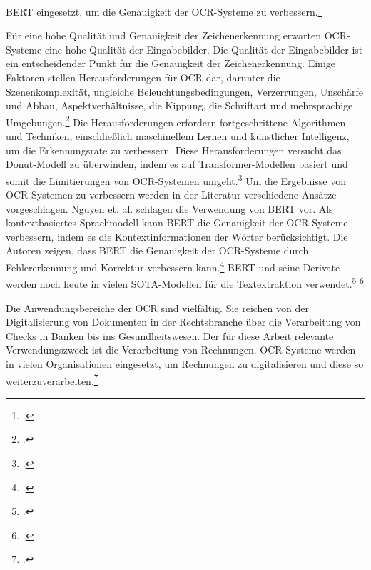 \ac{BERT} eingesetzt, um die Genauigkeit der OCR-Systeme zu verbessern.\footcites[Vgl.][S. 335 f.]{nguyen_neural_2020}

Für eine hohe Qualität und Genauigkeit der Zeichenerkennung erwarten OCR-Systeme eine hohe Qualität der Eingabebilder. Die Qualität der Eingabebilder ist ein entscheidender Punkt für die Genauigkeit der Zeichenerkennung. Einige Faktoren stellen Herausforderungen für OCR dar, darunter die Szenenkomplexität, ungleiche Beleuchtungsbedingungen, Verzerrungen, Unschärfe und Abbau, Aspektverhältnisse, die Kippung, die Schriftart und mehrsprachige Umgebungen.\footcites[Vgl.][S. 245]{hamad_detailed_2016} Die Herausforderungen erfordern fortgeschrittene Algorithmen und Techniken, einschließlich maschinellem Lernen und künstlicher Intelligenz, um die Erkennungsrate zu verbessern. Diese Herausforderungen versucht das Donut-Modell zu überwinden, indem es auf Transformer-Modellen basiert und somit die Limitierungen von OCR-Systemen umgeht.\footcites[Vgl.][S. 1]{kim_ocr-free_2021} Um die Ergebnisse von OCR-Systemen zu verbessern werden in der Literatur verschiedene Ansätze vorgeschlagen. Nguyen et. al. schlagen die Verwendung von BERT vor. Als kontextbasiertes Sprachmodell kann BERT die Genauigkeit der OCR-Systeme verbessern, indem es die Kontextinformationen der Wörter berücksichtigt. Die Autoren zeigen, dass BERT die Genauigkeit der OCR-Systeme durch Fehlererkennung und Korrektur verbessern kann.\footcites[Vgl.][S. 335 f.]{nguyen_neural_2020} BERT und seine Derivate werden noch heute in vielen \ac{SOTA}-Modellen für die Textextraktion verwendet.\footcites[Vgl. dazu ausführlich][S. 4084 ff.]{huang_layoutlmv3_2022} \footcites[Vgl. dazu ausführlich][S. 2 ff.]{garncarek_lambert_2020}

Die Anwendungsbereiche der OCR sind vielfältig. Sie reichen von der Digitalisierung von Dokumenten in der Rechtsbranche über die Verarbeitung von Checks in Banken bis ins Gesundheitswesen. Der für diese Arbeit relevante Verwendungszweck ist die Verarbeitung von Rechnungen. OCR-Systeme werden in vielen Organisationen eingesetzt, um Rechnungen zu digitalisieren und diese so weiterzuverarbeiten.\footcites[Vgl.][S. 247 f.]{hamad_detailed_2016}

